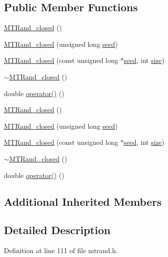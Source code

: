 \subsection*{Public Member Functions}
\begin{DoxyCompactItemize}
\item 
\hyperlink{a00018_a09b3b21b3cb35d04f2b6c290a817b2e8}{M\-T\-Rand\-\_\-closed} ()
\item 
\hyperlink{a00018_ad5dc83250b16f22d4693a18b51816271}{M\-T\-Rand\-\_\-closed} (unsigned long \hyperlink{a00019_a0c57076fe30358e0700a7ce1baa0ea27}{seed})
\item 
\hyperlink{a00018_a37e322f97253b7013823a267bcfe82d1}{M\-T\-Rand\-\_\-closed} (const unsigned long $\ast$\hyperlink{a00019_a0c57076fe30358e0700a7ce1baa0ea27}{seed}, int \hyperlink{a00104_ae113ea7f9e515a12ac4b5595c6faf61e}{size})
\item 
\hyperlink{a00018_a46567ee841b5f54b305ac051ac837a8c}{$\sim$\-M\-T\-Rand\-\_\-closed} ()
\item 
double \hyperlink{a00018_ad0c535263b63c95029523183f672f62d}{operator()} ()
\item 
\hyperlink{a00018_a09b3b21b3cb35d04f2b6c290a817b2e8}{M\-T\-Rand\-\_\-closed} ()
\item 
\hyperlink{a00018_ad5dc83250b16f22d4693a18b51816271}{M\-T\-Rand\-\_\-closed} (unsigned long \hyperlink{a00019_a0c57076fe30358e0700a7ce1baa0ea27}{seed})
\item 
\hyperlink{a00018_a37e322f97253b7013823a267bcfe82d1}{M\-T\-Rand\-\_\-closed} (const unsigned long $\ast$\hyperlink{a00019_a0c57076fe30358e0700a7ce1baa0ea27}{seed}, int \hyperlink{a00104_ae113ea7f9e515a12ac4b5595c6faf61e}{size})
\item 
\hyperlink{a00018_a46567ee841b5f54b305ac051ac837a8c}{$\sim$\-M\-T\-Rand\-\_\-closed} ()
\item 
double \hyperlink{a00018_ad0c535263b63c95029523183f672f62d}{operator()} ()
\end{DoxyCompactItemize}
\subsection*{Additional Inherited Members}


\subsection{Detailed Description}


Definition at line 111 of file mtrand.\-h.



